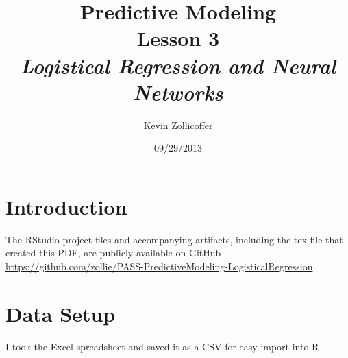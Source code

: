 \documentclass{article}
\author{Kevin Zollicoffer}
\title{Predictive Modeling\\Lesson 3\\\emph{Logistical Regression and Neural Networks}}
\date{09/29/2013}
\begin{document}
\maketitle


\section*{Introduction}
The RStudio project files and accompanying artifacts, including the tex file that created this PDF, are publicly available on GitHub
\\
\url{https://github.com/zollie/PASS-PredictiveModeling-LogisticalRegression}

\section*{Data Setup}
I took the Excel spreadsheet and saved it as a CSV for easy import into R
\end{document}
